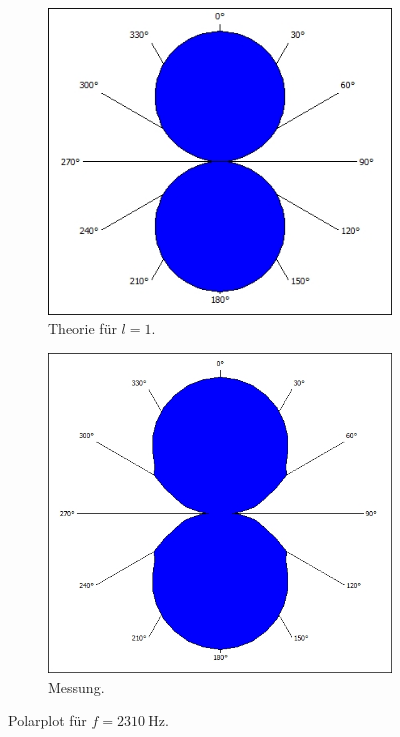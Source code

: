 \begin{figure}
    \centering
    \begin{subfigure}[b]{0.475\textwidth}
        \centering
        \begin{minipage}{\textwidth}\includegraphics[width=\textwidth]{ressources/l1.jpg}\end{minipage}
        \caption[]%
        {{\small Theorie für $l=1$.}}
        \label{fig:2_10a}
    \end{subfigure}
    \hfill
    \begin{subfigure}[b]{0.475\textwidth}
        \centering
        \begin{minipage}{\textwidth}\includegraphics[width=\textwidth]{messdaten/2_3_2310.jpg}\end{minipage}
        \caption[]%
        {{\small Messung.}}
        \label{fig:2_10b}
    \end{subfigure}
    \caption[]
    {Polarplot für $f=\SI{2310}{\hertz}$.}
    \label{fig:2_10}
\end{figure}
